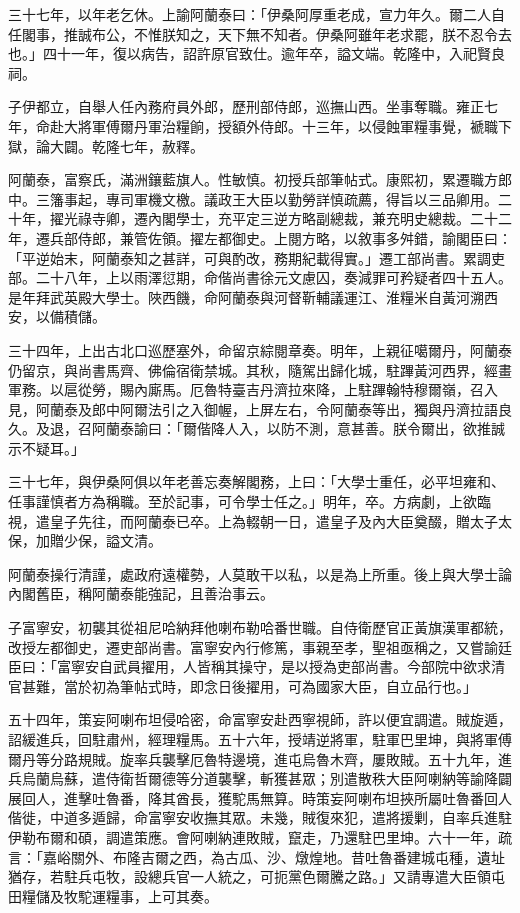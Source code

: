 \begin{pinyinscope}
三十七年，以年老乞休。上諭阿蘭泰曰：「伊桑阿厚重老成，宣力年久。爾二人自任閣事，推誠布公，不惟朕知之，天下無不知者。伊桑阿雖年老求罷，朕不忍令去也。」四十一年，復以病告，詔許原官致仕。逾年卒，謚文端。乾隆中，入祀賢良祠。

子伊都立，自舉人任內務府員外郎，歷刑部侍郎，巡撫山西。坐事奪職。雍正七年，命赴大將軍傅爾丹軍治糧餉，授額外侍郎。十三年，以侵蝕軍糧事覺，褫職下獄，論大闢。乾隆七年，赦釋。

阿蘭泰，富察氏，滿洲鑲藍旗人。性敏慎。初授兵部筆帖式。康熙初，累遷職方郎中。三籓事起，專司軍機文檄。議政王大臣以勤勞詳慎疏薦，得旨以三品卿用。二十年，擢光祿寺卿，遷內閣學士，充平定三逆方略副總裁，兼充明史總裁。二十二年，遷兵部侍郎，兼管佐領。擢左都御史。上閱方略，以敘事多舛錯，諭閣臣曰：「平逆始末，阿蘭泰知之甚詳，可與酌改，務期紀載得實。」遷工部尚書。累調吏部。二十八年，上以雨澤愆期，命偕尚書徐元文慮囚，奏減罪可矜疑者四十五人。是年拜武英殿大學士。陜西饑，命阿蘭泰與河督靳輔議運江、淮糧米自黃河溯西安，以備積儲。

三十四年，上出古北口巡歷塞外，命留京綜閱章奏。明年，上親征噶爾丹，阿蘭泰仍留京，與尚書馬齊、佛倫宿衛禁城。其秋，隨駕出歸化城，駐蹕黃河西界，經畫軍務。以扈從勞，賜內廝馬。厄魯特臺吉丹濟拉來降，上駐蹕翰特穆爾嶺，召入見，阿蘭泰及郎中阿爾法引之入御幄，上屏左右，令阿蘭泰等出，獨與丹濟拉語良久。及退，召阿蘭泰諭曰：「爾偕降人入，以防不測，意甚善。朕令爾出，欲推誠示不疑耳。」

三十七年，與伊桑阿俱以年老善忘奏解閣務，上曰：「大學士重任，必平坦雍和、任事謹慎者方為稱職。至於記事，可令學士任之。」明年，卒。方病劇，上欲臨視，遣皇子先往，而阿蘭泰已卒。上為輟朝一日，遣皇子及內大臣奠醊，贈太子太保，加贈少保，謚文清。

阿蘭泰操行清謹，處政府遠權勢，人莫敢干以私，以是為上所重。後上與大學士論內閣舊臣，稱阿蘭泰能強記，且善治事云。

子富寧安，初襲其從祖尼哈納拜他喇布勒哈番世職。自侍衛歷官正黃旗漢軍都統，改授左都御史，遷吏部尚書。富寧安內行修篤，事親至孝，聖祖亟稱之，又嘗諭廷臣曰：「富寧安自武員擢用，人皆稱其操守，是以授為吏部尚書。今部院中欲求清官甚難，當於初為筆帖式時，即念日後擢用，可為國家大臣，自立品行也。」

五十四年，策妄阿喇布坦侵哈密，命富寧安赴西寧視師，許以便宜調遣。賊旋遁，詔緩進兵，回駐肅州，經理糧馬。五十六年，授靖逆將軍，駐軍巴里坤，與將軍傅爾丹等分路規賊。旋率兵襲擊厄魯特邊境，進屯烏魯木齊，屢敗賊。五十九年，進兵烏蘭烏蘇，遣侍衛哲爾德等分道襲擊，斬獲甚眾；別遣散秩大臣阿喇納等諭降闢展回人，進擊吐魯番，降其酋長，獲駝馬無算。時策妄阿喇布坦挾所屬吐魯番回人偕徙，中道多遁歸，命富寧安收撫其眾。未幾，賊復來犯，遣將援剿，自率兵進駐伊勒布爾和碩，調遣策應。會阿喇納連敗賊，竄走，乃還駐巴里坤。六十一年，疏言：「嘉峪關外、布隆吉爾之西，為古瓜、沙、燉煌地。昔吐魯番建城屯種，遺址猶存，若駐兵屯牧，設總兵官一人統之，可扼黨色爾騰之路。」又請專遣大臣領屯田糧儲及牧駝運糧事，上可其奏。


\end{pinyinscope}
